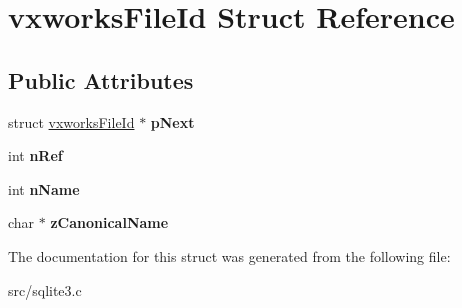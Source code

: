 \hypertarget{structvxworks_file_id}{\section{vxworks\-File\-Id Struct Reference}
\label{structvxworks_file_id}
}
\subsection*{Public Attributes}
\begin{DoxyCompactItemize}
\item 
\hypertarget{structvxworks_file_id_a1941104384e7aa1ad9d8574d091abe3a}{struct \hyperlink{structvxworks_file_id}{vxworks\-File\-Id} $\ast$ {\bfseries p\-Next}}\label{structvxworks_file_id_a1941104384e7aa1ad9d8574d091abe3a}

\item 
\hypertarget{structvxworks_file_id_a59dde49ee027786a06de8ad59b1d7883}{int {\bfseries n\-Ref}}\label{structvxworks_file_id_a59dde49ee027786a06de8ad59b1d7883}

\item 
\hypertarget{structvxworks_file_id_af7ed9a749d73b74b534bc06baf1abf6d}{int {\bfseries n\-Name}}\label{structvxworks_file_id_af7ed9a749d73b74b534bc06baf1abf6d}

\item 
\hypertarget{structvxworks_file_id_a032c9aaaa13ff100d9f3cd53926587fe}{char $\ast$ {\bfseries z\-Canonical\-Name}}\label{structvxworks_file_id_a032c9aaaa13ff100d9f3cd53926587fe}

\end{DoxyCompactItemize}


The documentation for this struct was generated from the following file\-:\begin{DoxyCompactItemize}
\item 
src/sqlite3.\-c\end{DoxyCompactItemize}
